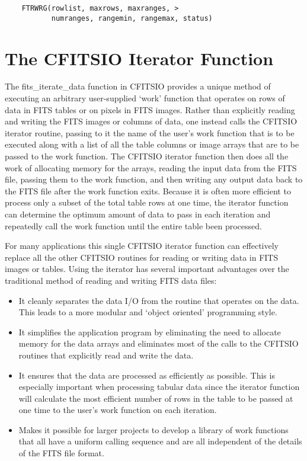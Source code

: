 \documentclass[11pt]{book}
\begin{document}
\begin{verbatim}
    FTRWRG(rowlist, maxrows, maxranges, >
           numranges, rangemin, rangemax, status)
\end{verbatim}



\chapter{ The CFITSIO Iterator Function }

The fits\_iterate\_data function in CFITSIO provides a unique method of
executing an arbitrary user-supplied `work' function that operates on
rows of data in  FITS tables or on pixels in FITS images.  Rather than
explicitly reading and writing the FITS images or columns of data, one
instead calls the CFITSIO iterator routine, passing to it the name of
the user's work function that is to be executed along with a list of
all the table columns or image arrays that are to be passed to the work
function.  The CFITSIO iterator function then does all the work of
allocating memory for the arrays, reading the input data from the FITS
file, passing them to the work function, and then writing any output
data back to the FITS file after the work function exits.  Because
it is often more efficient to process only a subset of the total table
rows at one time, the iterator function can determine the optimum
amount of data to pass in each iteration and repeatedly call the work
function until the entire table been processed.

For many applications this single CFITSIO iterator function can
effectively replace all the other CFITSIO routines for reading or
writing data in FITS images or tables.  Using the iterator has several
important advantages over the traditional method of reading and writing
FITS data files:

\begin{itemize}
\item
It cleanly separates the data I/O from the routine that operates on
the data.  This leads to a more modular and `object oriented'
programming style.

\item
It simplifies the application program by eliminating the need to allocate
memory for the data arrays and eliminates most of the calls to the CFITSIO
routines that explicitly read and write the data.

\item
It ensures that the data are processed as efficiently as possible.
This is especially important when processing tabular data since
the iterator function will calculate the most efficient number
of rows in the table to be passed at one time to the user's work
function on each iteration.

\item
Makes it possible for larger projects to develop a library of work
functions that all have a uniform calling sequence and are all
independent of the details of the FITS file format.

\end{itemize}
\end{document}

